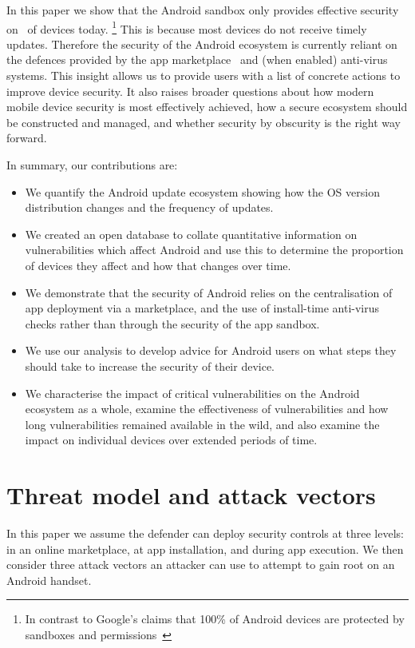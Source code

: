 \documentclass{llncs}
\begin{document}
In this paper we show that the Android sandbox only provides effective security on \daMeanSecurityPercTwosfNominal\ of devices today.%
\footnote{In contrast to Google's claims that 100\% of Android devices are protected by sandboxes and permissions~\cite{Patterson2013}}
This is because most devices do not receive timely updates. 
Therefore the security of the Android ecosystem is currently reliant on the defences provided by the app marketplace~\cite{AndroidSecurity2014} and (when enabled) anti-virus systems.
This insight allows us to provide users with a list of concrete actions to improve device security. 
It also raises broader questions about how modern mobile device security is most effectively achieved, how a secure ecosystem should be constructed and managed, and whether security by obscurity is the right way forward.

In summary, our contributions are:
\begin{itemize}
 \item We quantify the Android update ecosystem showing how the OS version distribution changes and the frequency of updates.
 \item We created an open database to collate quantitative information on vulnerabilities which affect Android and use this to determine the proportion of devices they affect and how that changes over time.
 \item We demonstrate that the security of Android relies on the centralisation of app deployment via a marketplace, and the use of install-time anti-virus checks rather than through the security of the app sandbox.
 \item We use our analysis to develop advice for Android users on what steps they should take to increase the security of their device.
 \item We characterise the impact of critical vulnerabilities on the Android ecosystem as a whole, examine the effectiveness of vulnerabilities and how long vulnerabilities remained available in the wild, and also examine the impact on individual devices over extended periods of time.
 
\end{itemize}

\section{Threat model and attack vectors}
\label{sec:threatmodel}

In this paper we assume the defender can deploy security controls at three levels: in an online marketplace, at app installation, and during app execution.
We then consider three attack vectors an attacker can use to attempt to gain root on an Android handset.
\end{document}
